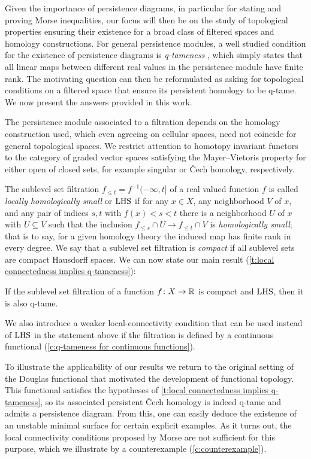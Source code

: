 Given the importance of persistence diagrams, in particular for stating and proving Morse inequalities, our focus will then be on the study of topological properties ensuring their existence for a broad class of filtered spaces and homology constructions.
For general persistence modules, a well studied condition for the existence of persistence diagrams is \emph{q-tameness} \cite{Chazal.2016a,Chazal.2016b}, which simply states that all linear maps between different real values in the persistence module have finite rank.
The motivating question can then be reformulated as asking for topological conditions on a filtered space that ensure its persistent homology to be q-tame.
We now present the answers provided in this work.

The persistence module associated to a filtration depends on the homology construction used, which even agreeing on cellular spaces, need not coincide for general topological spaces.
We restrict attention to homotopy invariant functors to the category of graded vector spaces satisfying the Mayer--Vietoris property for either open of closed sets, for example singular or \v{C}ech homology, respectively.

The sublevel set filtration $f_{\leq t} = f^{-1}(-\infty, t]$ of a real valued function $f$ is called \emph{locally homologically small} or \emph{$\mathrm{LHS}$} if for any $x \in X$, any neighborhood $V$ of $x$, and any pair of indices $s,t$ with $f(x) < s < t$ there is a neighborhood $U$ of $x$ with $U \subseteq V$ such that the inclusion $f_{\leq s} \cap U \to f_{\leq t} \cap V$ is \emph{homologically small}; that is to say, for a given homology theory the induced map has finite rank in every degree.
We say that a sublevel set filtration is \emph{compact} if all sublevel sets are compact Hausdorff spaces.
We can now state our main result (\cref{t:local connectedness implies q-tameness}):

\begin{thm*}
	If the sublevel set filtration of a function $f \colon X \to \mathbb{R}$ is compact and	$\mathrm{LHS}$, then it is also q-tame.
\end{thm*}

\noindent We also introduce a weaker local-connectivity condition that can be used instead of $\mathrm{LHS}$ in the statement above if the filtration is defined by a continuous functional (\cref{c:q-tameness for continuous functions}).

To illustrate the applicability of our results we return to the original setting of the Douglas functional that motivated the development of functional topology.
This functional satisfies the hypotheses of \cref{t:local connectedness implies q-tameness}, so its associated persistent \v{C}ech homology is indeed q-tame and admits a persistence diagram.
From this, one can easily deduce the existence of an unstable minimal surface for certain explicit examples.
As it turns out, the local connectivity conditions proposed by Morse \cite{Morse.1937} are not sufficient for this purpose, which we illustrate by a counterexample (\cref{c:counterexample}).


